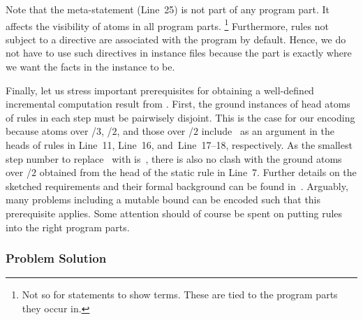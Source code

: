 Note that the  meta-statement (Line~25)
is not part of any program part.
It affects the visibility of atoms in all program parts.%
\footnote{Not so for  statements to show terms.
These are tied to the program parts they occur in.}
Furthermore, rules not subject to a  directive are associated with the  program by default.
Hence, we do not have to use such directives in instance files
because the  part is exactly where we want the facts in the instance to be.

Finally, let us stress important prerequisites for obtaining
a well-defined incremental computation result from \clingo.
First, the ground instances of head atoms of rules in each step must be pairwisely disjoint.
This is the case for our encoding because atoms over /$3$, /$2$,
and those over /$2$ include~ as an argument in the
heads of rules in Line~11, Line~16, and~Line~17--18, respectively.
As the smallest step number to replace~ with is~,
there is also no clash with the ground atoms over /$2$
obtained from the head of the static rule in Line~7.
Further details on the sketched requirements and their formal background can
be found in~\cite{gekakaosscth08a}.
Arguably, many problems including a mutable bound can be encoded
such that this prerequisite applies.
Some attention should of course be spent on putting rules into the right program parts.

\subsubsection{Problem Solution}\label{subsec:block:solution}

